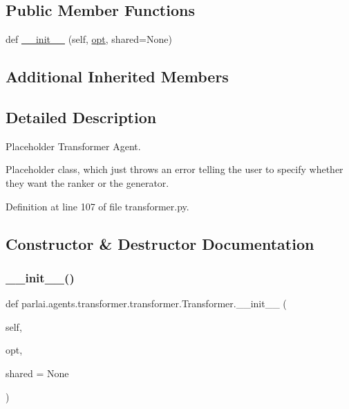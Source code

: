 \subsection*{Public Member Functions}
\begin{DoxyCompactItemize}
\item 
def \hyperlink{classparlai_1_1agents_1_1transformer_1_1transformer_1_1Transformer_ac71f8b1da727e5a62f56700fd87f3d60}{\+\_\+\+\_\+init\+\_\+\+\_\+} (self, \hyperlink{classparlai_1_1core_1_1agents_1_1Agent_ab3b45d2754244608c75d4068b90cd051}{opt}, shared=None)
\end{DoxyCompactItemize}
\subsection*{Additional Inherited Members}


\subsection{Detailed Description}
\begin{DoxyVerb}Placeholder Transformer Agent.

Placeholder class, which just throws an error telling the user to specify whether
they want the ranker or the generator.
\end{DoxyVerb}
 

Definition at line 107 of file transformer.\+py.



\subsection{Constructor \& Destructor Documentation}
\mbox{\label{classparlai_1_1agents_1_1transformer_1_1transformer_1_1Transformer_ac71f8b1da727e5a62f56700fd87f3d60}} 
\subsubsection{\texorpdfstring{\+\_\+\+\_\+init\+\_\+\+\_\+()}{\_\_init\_\_()}}
{\footnotesize\ttfamily def parlai.\+agents.\+transformer.\+transformer.\+Transformer.\+\_\+\+\_\+init\+\_\+\+\_\+ (\begin{DoxyParamCaption}\item[{}]{self,  }\item[{}]{opt,  }\item[{}]{shared = {\ttfamily None} }\end{DoxyParamCaption})}




